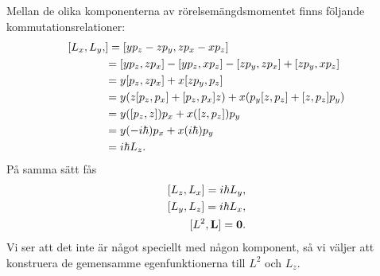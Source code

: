Mellan de olika komponenterna av rörelsemängdsmomentet finns följande kommutationsrelationer:
\begin{align*}
	\commut{L_{x}, L_{y}} &= \commut{yp_{z} - zp_{y}}{zp_{x} - xp_{z}} \\
	                      &= \commut{yp_{z}}{zp_{x}} - \commut{yp_{z}}{xp_{z}} - \commut{zp_{y}}{zp_{x}} + \commut{zp_{y}}{xp_{z}} \\
	                      &= y\commut{p_{z}}{zp_{x}} + x\commut{zp_{y}}{p_{z}} \\
	                      &= y(z\commut{p_{z}}{p_{x}} + \commut{p_{z}}{p_{x}}z) + x(p_{y}\commut{z}{p_{z}} + \commut{z}{p_{z}}p_{y}) \\
	                      &= y(\commut{p_{z}}{z})p_{x} + x(\commut{z}{p_{z}})p_{y} \\
	                      &= y(-i\hbar)p_{x} + x(i\hbar)p_{y} \\
	                      &= i\hbar L_{z}.
\end{align*}
På samma sätt fås
\begin{align*}
	\commut{L_{z}}{L_{x}} = i\hbar L_{y}, \\
	\commut{L_{y}}{L_{z}} = i\hbar L_{x}, \\
	\commut{L^{2}}{\vb{L}} = \vb{0}.
\end{align*}
Vi ser att det inte är något speciellt med någon komponent, så vi väljer att konstruera de gemensamme egenfunktionerna till $L^{2}$ och $L_{z}$.


